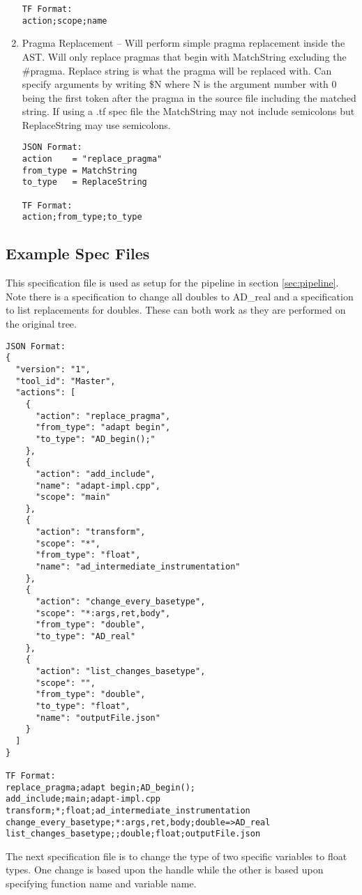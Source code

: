 \documentclass[natbib]{article}
\begin{document}
\begin{enumerate}
\begin{verbatim}
TF Format:
action;scope;name
\end{verbatim}

\item{} Pragma Replacement -- Will perform simple pragma replacement inside the AST. Will only 
replace pragmas that begin with MatchString excluding the \#pragma. Replace string is what the 
pragma will be replaced with. Can specify arguments by writing \$N where N is the argument 
number with 0 being the first token after the pragma in the source file including the matched string.
If using a .tf spec file the MatchString may not include semicolons but ReplaceString may 
use semicolons.

\begin{verbatim}
JSON Format:
action    = "replace_pragma"
from_type = MatchString
to_type   = ReplaceString

TF Format:
action;from_type;to_type
\end{verbatim}
\end{enumerate}

\subsection{Example Spec Files} \label{sec:expampleSpec}
This specification file is used as setup for the pipeline in section \ref{sec:pipeline}. 
Note there is a specification to change all doubles to AD\_real and a specification to 
list replacements for doubles. These can both work as they are performed on the original tree.
\begin{verbatim}
JSON Format:
{
  "version": "1",
  "tool_id": "Master",
  "actions": [
    {
      "action": "replace_pragma",
      "from_type": "adapt begin",
      "to_type": "AD_begin();"
    },
    {
      "action": "add_include",
      "name": "adapt-impl.cpp",
      "scope": "main"
    },
    {
      "action": "transform",
      "scope": "*",
      "from_type": "float",
      "name": "ad_intermediate_instrumentation"
    },
    {
      "action": "change_every_basetype",
      "scope": "*:args,ret,body",
      "from_type": "double",
      "to_type": "AD_real"
    },
    {
      "action": "list_changes_basetype",
      "scope": "",
      "from_type": "double",
      "to_type": "float",
      "name": "outputFile.json"
    }
  ]
}

TF Format:
replace_pragma;adapt begin;AD_begin();
add_include;main;adapt-impl.cpp
transform;*;float;ad_intermediate_instrumentation
change_every_basetype;*:args,ret,body;double=>AD_real
list_changes_basetype;;double;float;outputFile.json
\end{verbatim}
\vspace{5mm}
The next specification file is to change the type of two specific variables to float types.
One change is based upon the handle while the other is based upon specifying function 
name and variable name.
\end{document}
